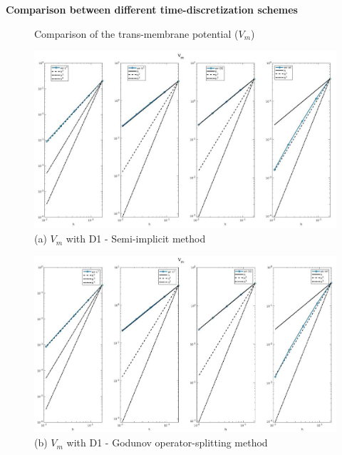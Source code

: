 \documentclass[a4paper,11pt]{article}
\begin{document}
\begin{center}
\textbf{Comparison between different time-discretization schemes}
\end{center}
\begin{figure}[h]
\caption{Comparison of the trans-membrane potential ($V_m$)}
\label{Vm-time}
\begin{center}
\includegraphics[width = \textwidth]{./D1_Vm_1.jpg}
\caption*{(a) $V_m$ with D1 - Semi-implicit method}
\end{center}
\end{figure}
\begin{figure}[H]
\begin{center}
\includegraphics[width =\textwidth]{./D1_Vm_1_GO.jpg}
\caption*{(b) $V_m$ with D1 - Godunov operator-splitting method}
\end{center}
\end{figure}
\newpage
\end{document}
